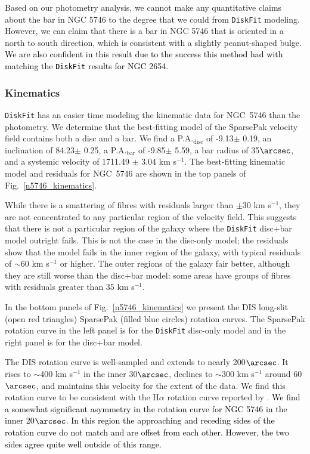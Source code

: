\documentclass[a4paper,fleqn,usenatbib]{mnras}
\newcommand{\authorfix}{\textcolor{black}}
\begin{document}
Based on our photometry analysis, we cannot make any quantitative claims about the bar in NGC 5746 to the degree that we could from \texttt{DiskFit} modeling. However, we can claim that there is a bar in NGC 5746 that is oriented in a north to south direction, which is consistent with a slightly peanut-shaped bulge. \authorfix{We are also confident in this result due to the success this method had with matching the \texttt{DiskFit} results for NGC 2654.}

\subsubsection{Kinematics}
\label{sec:n5746kine}

\texttt{DiskFit} has an easier time modeling the kinematic data for NGC~5746 than the photometry.  We determine that the best-fitting model of the SparsePak velocity field contains both a disc and a bar. We find a P.A.$_{\mathrm{disc}}$ of -9.13\degr $\pm$ 0.19, an inclination of 84.23\degr $\pm$ 0.25, a P.A.$_{\mathrm{bar}}$ of -9.85\degr $\pm$ 5.59, a bar radius of 35$\arcsec$, and a systemic velocity of 1711.49 $\pm$ 3.04 km s$^{-1}$.  The best-fitting kinematic model and residuals for NGC~5746 are shown in the top panels of Fig.~\ref{n5746_kinematics}. 

While there is a smattering of fibres with residuals larger than $\pm$30 km s$^{-1}$, they are not concentrated to any particular region of the velocity field. This suggests that there is not a particular region of the galaxy where the \texttt{DiskFit} disc+bar model outright fails.  This is not the case in the disc-only model; the residuals show that the model fails in the inner region of the galaxy, with typical residuals of $\sim$60 km s$^{-1}$ or higher. The outer regions of the galaxy fair better, although they are still worse than the disc+bar model: some areas have groups of fibres with residuals greater than 35 km s$^{-1}$.

In the bottom panels of Fig.~\ref{n5746_kinematics} we present the DIS long-slit (open red triangles) SparsePak (filled blue circles) rotation curves.  The SparsePak rotation curve in the left panel is for the \texttt{DiskFit} disc-only model and in the right panel is for the disc+bar model.

The DIS rotation curve is well-sampled and extends to nearly 200$\arcsec$.  It rises to $\sim$400 km s$^{-1}$ in the inner 30$\arcsec$, declines to $\sim$300 km s$^{-1}$ around 60$\arcsec$, and maintains this velocity for the extent of the data.  We find this rotation curve to be consistent with the H$\alpha$ rotation curve reported by  \citet{keel1996}. \authorfix{We find a somewhat significant asymmetry in the rotation curve for NGC 5746 in the inner 20$\arcsec$. In this region the approaching and receding sides of the rotation curve do not match and are offset from each other. However, the two sides agree quite well outside of this range.}
\end{document}
